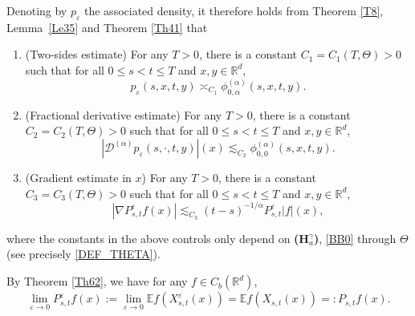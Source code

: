 \documentclass[JEP,XML,SOM,Unicode,published]{cedram}
\theoremstyle{plain}
\theoremstyle{definition}
\let\eps\varepsilon
\newcommand\cD{{\mathcal D}}
\newcommand\mE{\mathbb{E}}
\newcommand\mR{\mathbb{R}}
\newcommand\1{{\mathbf{1}}}
\begin{document}
Denoting by $p_\eps $ the associated density, it therefore holds from Theorem \ref{T8},
Lem\-ma~\ref{Le35} and Theorem \ref{Th41} that
\begin{enumerate}
\item (Two-sides estimate) For any $T>0$, there is a constant $C_1=C_1(T,\Theta)>0$ such that for all $0\leq s<t\leq T$ and $x,y\in\mR^d$,
\begin{equation}\label{TW_EPS}
p_\eps(s,x,t,y)\asymp_{C_1} \phi^{(\alpha)}_{0,\alpha}(s,x,t,y).
\end{equation}
\item (Fractional derivative estimate) For any $T>0$, there is a constant $C_2=C_2(T,\Theta)>0$ such that for all $0\leq s<t\leq T$ and $x,y\in\mR^d$,
\begin{equation}\label{FR_EPS}
|\cD^{(\alpha)}{p_\eps(s,\cdot,t,y)}|(x)\lesssim_{C_2}\phi^{(\alpha)}_{0,0}(s,x,t,y).
\end{equation}
\item (Gradient estimate in $x$) For any $T>0$, there is a constant $C_3=C_3(T,\Theta)>0$ such that for all $0\leq s<t\leq T$ and $x,y\in\mR^d$,
\begin{equation}\label{GR_EPS}
|\nabla P^\eps_{s,t}f(x)|\lesssim_{C_3} (t-s)^{-1/\alpha}P^\eps_{s,t}|f|(x),
\end{equation}
\end{enumerate}
where the constants in the above controls only depend on {\bf (H$^\gamma_a$)}, \eqref{BB0} through $\Theta $
(see precisely \eqref{DEF_THETA}).

By Theorem \ref{Th62}, we have for any $f\in C_b(\mR^d)$,
\begin{equation}\label{LL9}
\lim_{\eps\to 0}P^\eps_{s,t}f(x):=\lim_{\eps\to 0}\mE f(X^\eps_{s,t}(x))=\mE f(X_{s,t}(x))=:P_{s,t}f(x).
\end{equation}
\end{document}
